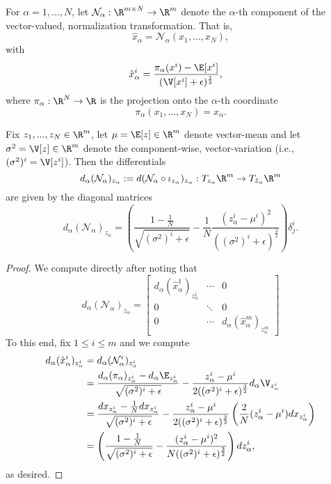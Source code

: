 \begin{cor}
	For $\alpha=1,...,N$, let $\mathcal{N}_\alpha:\R^{m\times N}\to\R^m$ denote the $\alpha$-th component of the vector-valued, normalization transformation.  That is,
		$$\hat{x}_\alpha=\mathcal{N}_\alpha(x_1,...,x_N),$$
		with
		\begin{align*}
			\hat{x}_\alpha^i&=\frac{\pi_\alpha(x^i)-\E[x^i]}{(\V[x^i]+\epsilon)^{\frac{1}{2}}},
		\end{align*}
		where $\pi_\alpha:\R^N\to\R$ is the projection onto the $\alpha$-th coordinate
		$$\pi_\alpha(x_1,...,x_N)=x_\alpha.$$

	Fix $z_1,...,z_N\in\R^m$, let $\mu=\E[z]\in\R^m$ denote vector-mean and let $\sigma^2=\V[z]\in\R^m$ denote the component-wise, vector-variation (i.e., $(\sigma^2)^i=\V[z^i]$).   Then the differentials 
	$$d_\alpha(\mathcal{N}_\alpha)_{z_\alpha}:=d(\mathcal{N}_\alpha\circ\iota_{z_\alpha})_{z_\alpha}:T_{z_\alpha}\R^m\to T_{\hat{z}_\alpha}\R^m$$ are given by the diagonal matrices
	$$d_\alpha(\mathcal{N}_\alpha)_{z_\alpha}=\left(\frac{1-\frac{1}{N}}{\sqrt{(\sigma^2)^i+\epsilon}}-\frac{1}{N}\frac{(z_\alpha^i-\mu^i)^2}{((\sigma^2)^i+\epsilon)^{\frac{3}{2}}}\right)\delta^i_j.$$
	
\end{cor}

\begin{proof}
	We compute directly after noting that
	$$d_\alpha(\mathcal{N}_\alpha)_{z_\alpha}=\begin{bmatrix}
		d_\alpha(\hat{x}_\alpha^1)_{z_\alpha^1}&\cdots&0\\
		0&\ddots&0\\
		0&\cdots&d_\alpha(\hat{x}_\alpha^m)_{z_\alpha^m}
	\end{bmatrix}$$  
	To this end, fix $1\leq i\leq m$ and we compute
	\begin{align*}
		d_\alpha(\hat{x}_\alpha^i)_{z_\alpha^i}&=d_\alpha(\mathcal{N}_\alpha^i)_{z_\alpha^i}\\
		&=\frac{d_\alpha(\pi_\alpha)_{z_\alpha^i}-d_\alpha\E_{z_\alpha^i}}{\sqrt{(\sigma^2)^i+\epsilon}}-\frac{z_\alpha^i-\mu^i}{2((\sigma^2)^i+\epsilon)^{\frac{3}{2}}}d_\alpha\V_{z_\alpha^i}\\
		&=\frac{dx_{z_\alpha^i}-\frac{1}{N}dx_{z_\alpha^i}}{\sqrt{(\sigma^2)^i+\epsilon}}-\frac{z_\alpha^i-\mu^i}{2((\sigma^2)^i+\epsilon)^{\frac{3}{2}}}\left(\frac{2}{N}(z_\alpha^i-\mu^i)dx_{z_\alpha^i}\right)\\
		&=\left(\frac{1-\frac{1}{N}}{\sqrt{(\sigma^2)^i+\epsilon}}-\frac{(z_\alpha^i-\mu^i)^2}{N((\sigma^2)^i+\epsilon)^{\frac{3}{2}}}\right)dz_\alpha^i,
	\end{align*}
	as desired.
\end{proof}


